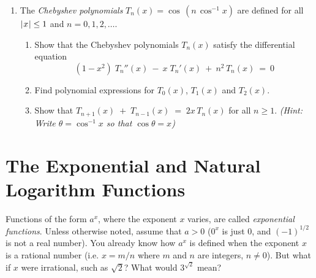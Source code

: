 {\begin{enumerate}[item-label={\bfseries \arabic*.}]
 \item The \emph{Chebyshev polynomials}
 $T_n(x) = \cos\,(n\,\cos^{-1} x)$ are defined for all $\lvert\mspace{1mu}x\mspace{1mu}\rvert \le 1$ and
 $n = 0, 1, 2, \ldots$.
 \begin{enumerate}[item-label={\bfseries (a)}]
  \item Show that the Chebyshev polynomials $T_{n}(x)$ satisfy the differential
  equation
\[
(1 - x^2)\;T_{n}''(x) ~-~ x\;T_{n}'(x) ~+~ n^2\,T_{n}(x) ~=~ 0
\]
  \item Find polynomial expressions for $T_0(x)$, $T_1(x)$ and $T_2(x)$.
  \item Show that $T_{n+1}(x) \;+\; T_{n-1}(x) \;=\; 2x\,T_{n}(x)$ for all
  $n \ge 1$. \emph{(Hint: Write $\theta = \cos^{-1} x$ so that
  $\cos \theta = x$)}
 \end{enumerate}
\end{enumerate}}
\newpage
\section{The Exponential and Natural Logarithm Functions}
Functions of the form $a^x$, where the exponent $x$ varies, are called
\emph{exponential functions}.
Unless otherwise noted, assume that $a > 0$ ($0^x$ is just 0, and $(-1)^{1/2}$
is not a real number). You already know how $a^x$ is defined when the exponent
$x$ is a rational number (i.e. $x = m/n$ where $m$ and $n$ are integers,
$n \ne 0$). But what if $x$ were irrational, such as $\sqrt{2}$? What would
$3^{\sqrt{2}}$ mean?

